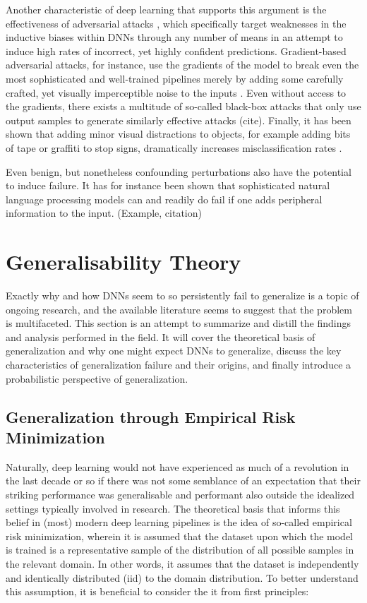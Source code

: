 	Another characteristic of deep learning that supports this argument is the effectiveness of adversarial attacks \cite{adversarial_bugs_features}, which specifically target weaknesses in the inductive biases within DNNs through any number of means in an attempt to induce high rates of incorrect, yet highly confident predictions. Gradient-based adversarial attacks, for instance, use the gradients of the model to break even the most sophisticated and well-trained pipelines merely by adding some carefully crafted, yet visually imperceptible noise to the inputs \cite{adversarial_attacks}. Even without access to the gradients, there exists a multitude of so-called black-box attacks that only use output samples to generate similarly effective attacks (cite). Finally, it has been shown that adding minor visual distractions to objects, for example adding bits of tape or graffiti to stop signs, dramatically increases misclassification rates \cite{physical_attacks}. 
	
	Even benign, but nonetheless confounding perturbations also have the potential to induce failure. It has for instance been shown that sophisticated natural language processing models can and readily do fail if one adds peripheral information to the input. (Example, citation)	 
	
\section{Generalisability Theory}
	Exactly why and how DNNs seem to so persistently fail to generalize is a topic of ongoing research, and the available literature seems to suggest that the problem is multifaceted. This section is an attempt to summarize and distill the findings and analysis performed in the field. It will cover the theoretical basis of generalization and why one might expect DNNs to generalize, discuss the key characteristics of generalization failure and their origins, and finally introduce a probabilistic perspective of generalization.
	\subsection{Generalization through Empirical Risk Minimization} 
		Naturally, deep learning would not have experienced as much of a revolution in the last decade or so if there was not some semblance of an expectation that their striking performance was generalisable and performant also outside the idealized settings typically involved in research. The theoretical basis that informs this belief in (most) modern deep learning pipelines is the idea of so-called empirical risk minimization, wherein it is assumed that the dataset upon which the model is trained is a representative sample of the distribution of all possible samples in the relevant domain. In other words, it assumes that the dataset is independently and identically distributed (iid) to the domain distribution. To better understand this assumption, it is beneficial to consider the it from first principles: 
		
